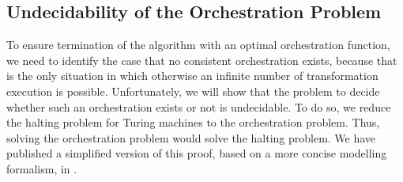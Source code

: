 





\subsection{Undecidability of the Orchestration Problem} %

To ensure termination of the  algorithm with an optimal orchestration function, we need to identify the case that no consistent orchestration exists, because that is the only situation in which otherwise an infinite number of transformation execution is possible.
Unfortunately, we will show that the problem to decide whether such an orchestration exists or not is undecidable.
To do so, we reduce the halting problem for Turing machines to the orchestration problem.
Thus, solving the orchestration problem would solve the halting problem.
We have published a simplified version of this proof, based on a more concise modelling formalism, in \cite{gleitze2020orchestration}.


